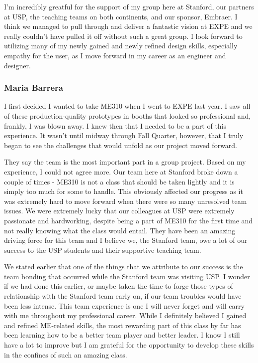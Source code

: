I'm incredibly greatful for the support of my group here at Stanford, our partners at USP, the teaching teams on both continents, and our sponsor, Embraer. I think we managed to pull through and deliver a fantastic vision at EXPE and we really couldn't have pulled it off without such a great group. I look forward to utilizing many of my newly gained and newly refined design skills, especially empathy for the user, as I move forward in my career as an engineer and designer.

\subsubsection{Maria Barrera}
I first decided I wanted to take ME310 when I went to EXPE last year. I saw all of these production-quality prototypes in booths that looked so professional and, frankly, I was blown away. I knew then that I needed to be a part of this experience. It wasn't until midway through Fall Quarter, however, that I truly began to see the challenges that would unfold as our project moved forward.

They say the team is the most important part in a group project. Based on my experience, I could not agree more. Our team here at Stanford broke down a couple of times - ME310 is not a class that should be taken lightly and it is simply too much for some to handle. This obviously affected our progress as it was extremely hard to move forward when there were so many unresolved team issues. We were extremely lucky that our colleagues at USP were extremely passionate and hardworking, despite being a part of ME310 for the first time and not really knowing what the class would entail. They have been an amazing driving force for this team and I believe we, the Stanford team, owe a lot of our success to the USP students and their supportive teaching team.

We stated earlier that one of the things that we attribute to our success is the team bonding that occurred while the Stanford team was visiting USP. I wonder if we had done this earlier, or maybe taken the time to forge those types of relationship with the Stanford team early on, if our team troubles would have been less intense. This team experience is one I will never forget and will carry with me throughout my professional career. While I definitely believed I gained and refined ME-related skills, the most rewarding part of this class by far has been learning how to be a better team player and better leader. I know I still have a lot to improve but I am grateful for the opportunity to develop these skills in the confines of such an amazing class. 

